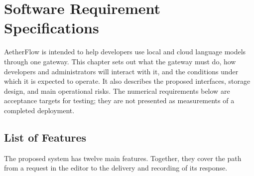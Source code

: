 \chapter{Software Requirement Specifications}
\label{ch:srs}

AetherFlow is intended to help developers use local and cloud language models through one gateway. This chapter sets out what the gateway must do, how developers and administrators will interact with it, and the conditions under which it is expected to operate. It also describes the proposed interfaces, storage design, and main operational risks. The numerical requirements below are acceptance targets for testing; they are not presented as measurements of a completed deployment.

\section{List of Features}
\label{sec:list-of-features}

The proposed system has twelve main features. Together, they cover the path from a request in the editor to the delivery and recording of its response.

